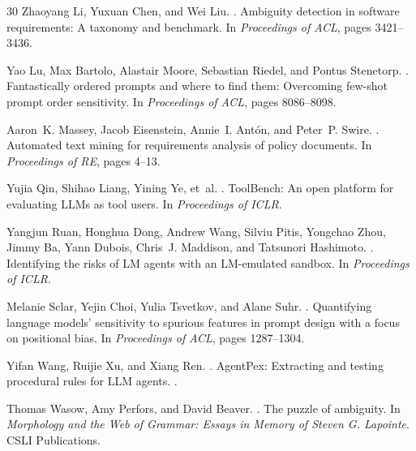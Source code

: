 \documentclass[11pt]{article}
\begin{document}
\begin{thebibliography}{30}
Zhaoyang Li, Yuxuan Chen, and Wei Liu.
.
\newblock Ambiguity detection in software requirements: A taxonomy and benchmark.
\newblock In {\em Proceedings of ACL}, pages 3421--3436.

Yao Lu, Max Bartolo, Alastair Moore, Sebastian Riedel, and Pontus Stenetorp.
.
\newblock Fantastically ordered prompts and where to find them: Overcoming few-shot prompt order sensitivity.
\newblock In {\em Proceedings of ACL}, pages 8086--8098.

Aaron~K. Massey, Jacob Eisenstein, Annie~I. Ant\'{o}n, and Peter~P. Swire.
.
\newblock Automated text mining for requirements analysis of policy documents.
\newblock In {\em Proceedings of RE}, pages 4--13.

Yujia Qin, Shihao Liang, Yining Ye, et~al.
.
\newblock ToolBench: An open platform for evaluating LLMs as tool users.
\newblock In {\em Proceedings of ICLR}.

Yangjun Ruan, Honghua Dong, Andrew Wang, Silviu Pitis, Yongchao Zhou, Jimmy Ba, Yann Dubois, Chris~J. Maddison, and Tatsunori Hashimoto.
.
\newblock Identifying the risks of LM agents with an LM-emulated sandbox.
\newblock In {\em Proceedings of ICLR}.

Melanie Sclar, Yejin Choi, Yulia Tsvetkov, and Alane Suhr.
.
\newblock Quantifying language models' sensitivity to spurious features in prompt design with a focus on positional bias.
\newblock In {\em Proceedings of ACL}, pages 1287--1304.

Yifan Wang, Ruijie Xu, and Xiang Ren.
.
\newblock AgentPex: Extracting and testing procedural rules for LLM agents.
.

Thomas Wasow, Amy Perfors, and David Beaver.
.
\newblock The puzzle of ambiguity.
\newblock In {\em Morphology and the Web of Grammar: Essays in Memory of Steven G. Lapointe}. CSLI Publications.


\end{thebibliography}
\end{document}

